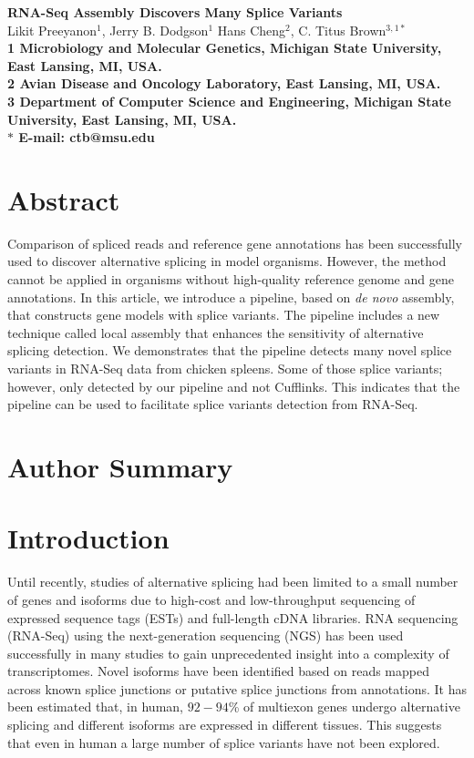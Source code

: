 \documentclass[10pt]{article}
\date{}
\begin{document}
\begin{flushleft}
{\Large
\textbf{RNA-Seq Assembly Discovers Many Splice Variants}
}
\\
Likit Preeyanon$^{1}$, 
Jerry B. Dodgson$^{1}$
Hans Cheng$^{2}$, 
C. Titus Brown$^{3,1 \ast}$
\\
\bf{1} Microbiology and Molecular Genetics, Michigan State University, East Lansing, MI, USA.
\\
\bf{2} Avian Disease and Oncology Laboratory, East Lansing, MI, USA.
\\
\bf{3} Department of Computer Science and Engineering, Michigan State University, East Lansing, MI, USA.
\\
$\ast$ E-mail: ctb@msu.edu
\end{flushleft}

\section*{Abstract}
Comparison of spliced reads and reference gene annotations has been successfully used to discover alternative
splicing in model organisms. However, the method cannot be applied in organisms without high-quality reference genome and
gene annotations. In this article, we introduce a pipeline, based on \emph{de novo} assembly, that constructs gene models with splice
variants.
The pipeline includes a new technique called local assembly that enhances the sensitivity of
alternative splicing detection.
We demonstrates that the pipeline detects many novel splice variants in RNA-Seq data from chicken spleens.
Some of those splice variants; however, only detected by our pipeline and not Cufflinks.
This indicates that the pipeline can be used to facilitate splice variants detection from RNA-Seq.
\section*{Author Summary}

\section*{Introduction}
Until recently, studies of alternative splicing had been limited to a small number of genes and isoforms due to high-cost and low-throughput sequencing of expressed sequence tags (ESTs) and full-length cDNA libraries.  
RNA sequencing (RNA-Seq) using the next-generation sequencing (NGS) has been used successfully in many studies to gain unprecedented insight into a complexity of transcriptomes.
Novel isoforms have been identified based on reads mapped across known splice junctions or putative splice junctions from annotations.
It has been estimated that, in human, $92-94$\% of multiexon genes undergo alternative splicing and different isoforms are expressed in different tissues\cite{Wang:2008ea}.
This suggests that even in human a large number of splice variants have not been explored.
\end{document}
